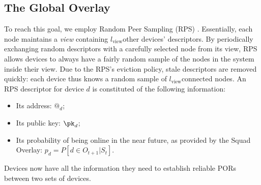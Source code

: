 \subsection{The Global Overlay}
\label{sec:global_overlay}

\newcommand{\viewsize}{\ensuremath{l_{\text{view}}}}


To reach this goal, we employ Random Peer Sampling (RPS) \cite{Voulgaris_Gavidia_van_Steen_2005,Jelasity_Voulgaris_Guerraoui_Kermarrec_van_Steen_2007}.
Essentially, each node maintains a \emph{view} containing \viewsize other devices' descriptors. 
By periodically exchanging random descriptors with a carefully selected node from its view, RPS allows devices to always have a fairly random sample of the nodes in the system inside their view.
Due to the RPS's eviction policy, stale descriptors are removed quickly: each device thus knows a random sample of \viewsize connected nodes.
An RPS descriptor for device $d$ is constituted of the following information:
\begin{itemize}
  \item Its address: $@_d$;
  \item Its public key: \(\pk_d\);
  \item Its probability of being online in the near future, as provided by the Squad Overlay: $p_d=P\left[d \in O_{t+1} | S_t\right]$.
\end{itemize}

Devices now have all the information they need to establish reliable PORs between two sets of devices.






